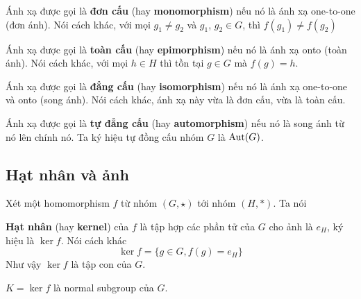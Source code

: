\begin{definition}
    Ánh xạ được gọi là \textbf{đơn cấu} (hay \textbf{monomorphism}) nếu nó là ánh xạ one-to-one (đơn ánh). Nói cách khác, với mọi $g_1 \neq g_2$ và $g_1$, $g_2 \in G$, thì $f(g_1) \neq f(g_2)$
\end{definition}

\begin{definition}
    Ánh xạ được gọi là \textbf{toàn cấu} (hay \textbf{epimorphism}) nếu nó là ánh xạ onto (toàn ánh). Nói cách khác, với mọi $h \in H$ thì tồn tại $g \in G$ mà $f(g) = h$.
\end{definition}

\begin{definition}
    Ánh xạ được gọi là \textbf{đẳng cấu} (hay \textbf{isomorphism}) nếu nó là ánh xạ one-to-one 
    và onto (song ánh). Nói cách khác, ánh xạ này vừa là đơn cấu, vừa là toàn cấu.
\end{definition}

\begin{definition}
    Ánh xạ được gọi là \textbf{tự đẳng cấu} (hay \textbf{automorphism}) nếu nó là song ánh từ nó lên chính nó. Ta ký hiệu tự đồng cấu nhóm $G$ là $\operatorname{Aut}(G)$.
\end{definition}

\subsection*{Hạt nhân và ảnh}

Xét một homomorphism $f$ từ nhóm $(G, \star)$ tới nhóm $(H, *)$. Ta nói

\begin{definition}
    \textbf{Hạt nhân} (hay \textbf{kernel}) của $f$ là tập hợp các phần tử của $G$ cho ảnh là $e_H$, ký hiệu là $\ker f$. Nói cách khác
    \begin{equation}
        \ker f = \{ g \in G, f(g) = e_H \}
    \end{equation}
    Như vậy $\ker f$ là tập con của $G$.
\end{definition}

\begin{remark}
    $K = \ker f$ là normal subgroup của $G$.
\end{remark}

